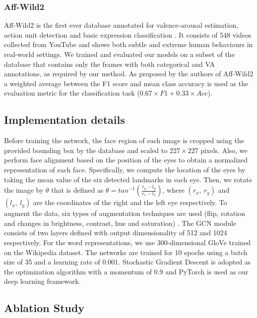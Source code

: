 \documentclass[a4paper, 10pt, conference]{ieeeconf}      \usepackage{FG2021}
\begin{document}
\subsubsection{Aff-Wild2} Aff-Wild2 is the first ever database annotated for valence-arousal estimation, action unit detection and basic expression classification \cite{kollias2019expression}. It consists of 548 videos collected from YouTube and shows both subtle and extreme human behaviours in real-world settings. We trained and evaluated our models on a subset of the database that contains only the frames with both categorical and VA annotations, as required by our method. As proposed by the authors of Aff-Wild2 a weighted average between the F1 score and mean class accuracy is used as the evaluation metric for the classification task ($0.67 \times \textit{F1} + 0.33 \times \textit{Acc}$).

\subsection{Implementation details}

Before training the network, the face region of each image is cropped using the provided bounding box by the database and scaled to $227 \times 227$ pixels. Also, we perform face alignment based on the position of the eyes to obtain a normalized representation of each face. Specifically, we compute the location of the eyes by taking the mean value of the six detected landmarks in each eye. Then, we rotate the image by $\theta$ that is defined as $\theta = tan^{-1}\left(\frac{r_y - l_y}{r_x - l_x}\right)$, where $(r_x, \ r_y)$ and $(l_x, \ l_y)$ are the coordinates of the right and the left eye respectively. To augment the data, six types of augmentation techniques are used (flip, rotation and changes in brightness, contrast, hue and saturation) \cite{hayale2019facial}. The GCN module consists of two layers defined with output dimensionality of 512 and 1024 respectively. For the word representations, we use 300-dimensional GloVe \cite{pennington2014glove} trained on the Wikipedia dataset. The networks are trained for 10 epochs using a batch size of 35 and a learning rate of 0.001. Stochastic Gradient Descent is adopted as the optimization algorithm with a momentum of 0.9 and PyTorch \cite{paszke2017automatic} is used as our deep learning framework.

\subsection{Ablation Study}
\end{document}
